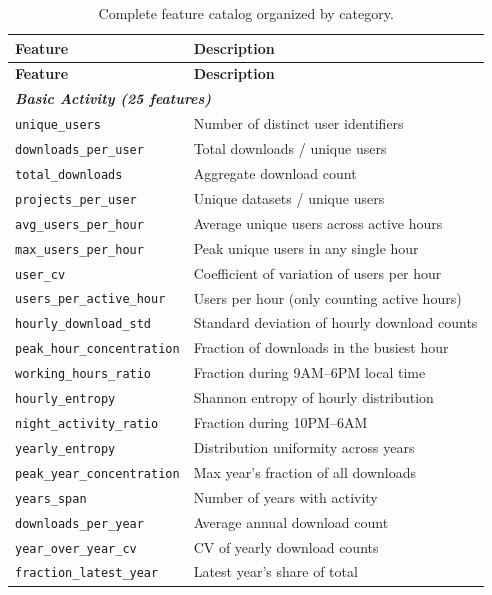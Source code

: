 \documentclass[11pt,a4paper]{article}
\begin{document}
\begin{longtable}{p{5.2cm}p{9.3cm}}
\caption{Complete feature catalog organized by category.}\label{tab:all_features}\\
\toprule
\textbf{Feature} & \textbf{Description} \\
\midrule
\endfirsthead
\toprule
\textbf{Feature} & \textbf{Description} \\
\midrule
\endhead
\multicolumn{2}{l}{\textit{\textbf{Basic Activity (25 features)}}} \\
\texttt{unique\_users} & Number of distinct user identifiers \\
\texttt{downloads\_per\_user} & Total downloads / unique users \\
\texttt{total\_downloads} & Aggregate download count \\
\texttt{projects\_per\_user} & Unique datasets / unique users \\
\texttt{avg\_users\_per\_hour} & Average unique users across active hours \\
\texttt{max\_users\_per\_hour} & Peak unique users in any single hour \\
\texttt{user\_cv} & Coefficient of variation of users per hour \\
\texttt{users\_per\_active\_hour} & Users per hour (only counting active hours) \\
\texttt{hourly\_download\_std} & Standard deviation of hourly download counts \\
\texttt{peak\_hour\_concentration} & Fraction of downloads in the busiest hour \\
\texttt{working\_hours\_ratio} & Fraction during 9AM--6PM local time \\
\texttt{hourly\_entropy} & Shannon entropy of hourly distribution \\
\texttt{night\_activity\_ratio} & Fraction during 10PM--6AM \\
\texttt{yearly\_entropy} & Distribution uniformity across years \\
\texttt{peak\_year\_concentration} & Max year's fraction of all downloads \\
\texttt{years\_span} & Number of years with activity \\
\texttt{downloads\_per\_year} & Average annual download count \\
\texttt{year\_over\_year\_cv} & CV of yearly download counts \\
\texttt{fraction\_latest\_year} & Latest year's share of total \\

\end{longtable}
\end{document}
